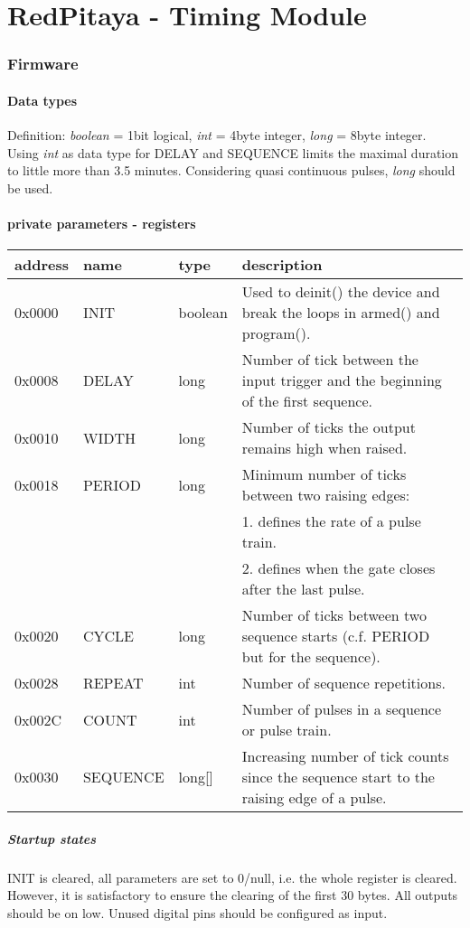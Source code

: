 \documentclass{article}
\begin{document}
\thispagestyle{empty}
\part*{\center RedPitaya - Timing Module}
\section*{Firmware}
\subsection*{Data types}
Definition: \textit{boolean} = 1bit logical, \textit{int} = 4byte integer, \textit{long} = 8byte integer.\\
Using \textit{int} as data type for DELAY and SEQUENCE limits the maximal duration to little more than 3.5 minutes. Considering quasi continuous pulses, \textit{long} should be used.
\subsection*{private parameters - registers}
\begin{tabular}{llll}
address&name&type&description\\\hline
0x0000&INIT&boolean&Used to deinit() the device and break the loops in armed() and program().\\
0x0008&DELAY&long&Number of tick between the input trigger and the beginning of the first sequence.\\
0x0010&WIDTH&long&Number of ticks the output remains high when raised.\\
0x0018&PERIOD&long&Minimum number of ticks between two raising edges:\\
&&& 1. defines the rate of a pulse train.\\
&&& 2. defines when the gate closes after the last pulse.\\
0x0020&CYCLE&long&Number of ticks between two sequence starts (c.f. PERIOD but for the sequence).\\
0x0028&REPEAT&int&Number of sequence repetitions.\\
0x002C&COUNT&int&Number of pulses in a sequence or pulse train.\\
0x0030&SEQUENCE&long[]&Increasing number of tick counts since the sequence start to the raising edge of a pulse.\\
\end{tabular}
\subsubsection*{Startup states}
INIT is cleared, all parameters are set to 0/null, i.e. the whole register is cleared. However, it is satisfactory to ensure the clearing of the first 30 bytes. All outputs should be on low. Unused digital pins should be configured as input.
\end{document}
